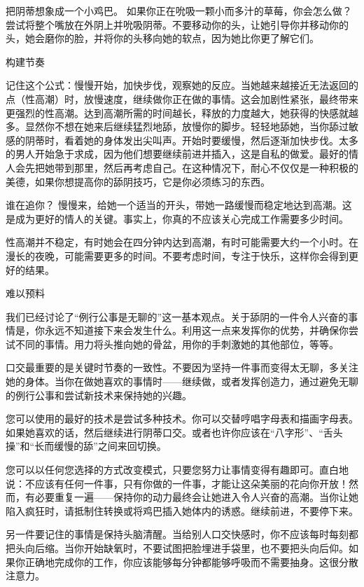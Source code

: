 \documentclass[12pt,UTF8]{ctexbook}
\begin{document}
把阴蒂想象成一个小鸡巴。 如果你正在吮吸一颗小而多汁的草莓，你会怎么做？ 尝试将整个嘴放在外阴上并吮吸阴蒂。不要移动你的头，让她引导你并移动你的头，她会磨你的脸，并将你的头移向她的软点，因为她比你更了解它们。

构建节奏

记住这个公式：慢慢开始，加快步伐，观察她的反应。当她越来越接近无法返回的点（性高潮）时，放慢速度，继续做你正在做的事情。这会加剧性紧张，最终带来更强烈的性高潮。达到高潮所需的时间越长，释放的力度越大，她获得的快感就越多。显然你不想在她来后继续猛烈地舔，放慢你的脚步。轻轻地舔她，当你舔过敏感的阴蒂时，看着她的身体发出尖叫声。开始时要缓慢，然后逐渐加快步伐。太多的男人开始急于求成，因为他们想要继续前进并插入，这是自私的做爱。最好的情人会先把她带到那里，然后再考虑自己。在这种情况下，耐心不仅仅是一种积极的美德，如果你想提高你的舔阴技巧，它是你必须练习的东西。

谁在追你？ 慢慢来，给她一个适当的开头，带她一路缓慢而稳定地达到高潮。这是成为更好的情人的关键。事实上，你真的不应该关心完成工作需要多少时间。

性高潮并不稳定，有时她会在四分钟内达到高潮，有时可能需要大约一个小时。在漫长的夜晚，可能需要更多的时间。不要考虑时间，专注于快乐，这样你会得到更好的结果。

难以预料

我们已经讨论了“例行公事是无聊的”这一基本观点。关于舔阴的一件令人兴奋的事情是，你永远不知道接下来会发生什么。利用这一点来发挥你的优势，并确保你尝试不同的事情。用力将头推向她的骨盆，用你的手刺激她的其他部位，等等。

口交最重要的是关键时节奏的一致性。不要因为坚持一件事而变得太无聊，多关注她的身体。当你在做她喜欢的事情时——继续做，或者发挥创造力，通过避免无聊的例行公事和尝试新技术来保持她的兴趣。

您可以使用的最好的技术是尝试多种技术。你可以交替哼唱字母表和描画字母表。如果她喜欢的话，然后继续进行阴蒂口交。或者也许你应该在“八字形”、“舌头操”和“长而缓慢的舔”之间来回切换。

您可以以任何您选择的方式改变模式，只要您努力让事情变得有趣即可。直白地说：不应该有任何一件事，只有你做的一件事，才能让这朵美丽的花向你开放！然而，有必要重复一遍——保持你的动力最终会让她进入令人兴奋的高潮。当你让她陷入疯狂时，请抵制住转换或将鸡巴插入她体内的诱惑。继续前进，不要停下来。

另一件要记住的事情是保持头脑清醒。当给别人口交快感时，你不应该每时每刻都把头向后缩。当你开始缺氧时，不要试图把脸埋进手袋里，也不要把头向后仰。如果你正确地完成你的工作，你应该能够每分钟都能够呼吸而不需要抽身。这很分散注意力。
\end{document}
